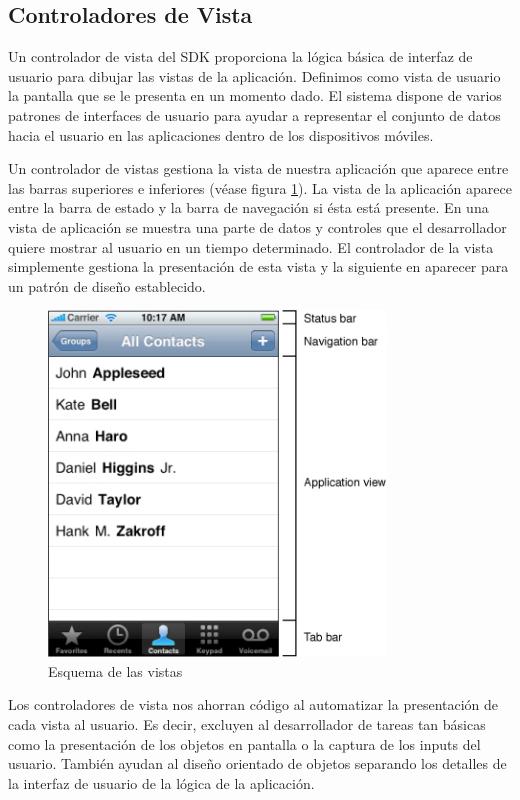 \subsection{Controladores de Vista}	   
 
 Un controlador de vista del SDK proporciona la lógica básica de interfaz de usuario para dibujar las vistas de la aplicación. Definimos como vista de usuario la pantalla que se le presenta en un momento dado. El sistema dispone de varios patrones de interfaces de usuario para ayudar a representar el conjunto de datos hacia el usuario en las aplicaciones dentro de los dispositivos móviles. 
 
  Un controlador de vistas gestiona la vista de nuestra aplicación que aparece entre las barras superiores e inferiores (véase figura \ref{fig:layout-of-views}).
  La vista de la aplicación aparece entre la barra de estado y la barra de navegación si ésta está presente. En una vista de aplicación se muestra una parte de datos y controles que el desarrollador quiere mostrar al usuario en un tiempo determinado. El controlador de la vista simplemente gestiona la presentación de esta vista y la siguiente en aparecer para un patrón de diseño establecido.
 
 \begin{figure} [h]
  \centering
    \includegraphics[width=0.8\textwidth]{./images/vc-areas.jpg}
  \caption{Esquema de las vistas }
  \label{fig:layout-of-views}
\end{figure} 
 
 Los controladores de vista nos ahorran código al automatizar la presentación de cada vista al usuario. Es decir, excluyen al desarrollador de tareas tan básicas como la presentación de los objetos en pantalla o la captura de los inputs del usuario. También ayudan al diseño orientado de objetos separando los detalles de la interfaz de usuario de la lógica de la aplicación.
  
